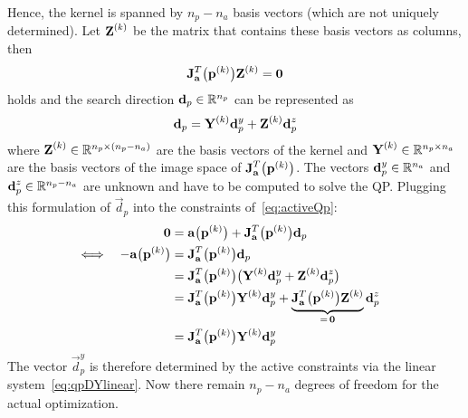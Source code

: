 				Hence, the kernel is spanned by \( n_p - n_a \) basis vectors (which are not uniquely determined). Let \( \boldsymbol{\mathrm{Z}}^{(k)} \) be the matrix that contains these basis vectors as columns, then
				\begin{align*}
					\boldsymbol{\mathrm{J}}_{\boldsymbol{\mathrm{a}}}^T\big(\boldsymbol{\mathrm{p}}^{(k)}\big) \boldsymbol{\mathrm{Z}}^{(k)} = \boldsymbol{\mathrm{0}}
				\end{align*}
				holds and the search direction \( \boldsymbol{\mathrm{d}}_p \in \mathbb{R}^{n_p} \) can be represented as
				\begin{align*}
					\boldsymbol{\mathrm{d}}_p = \boldsymbol{\mathrm{Y}}^{(k)} \boldsymbol{\mathrm{d}}_p^y + \boldsymbol{\mathrm{Z}}^{(k)} \boldsymbol{\mathrm{d}}_p^z
				\end{align*}
				where \( \boldsymbol{\mathrm{Z}}^{(k)} \in \mathbb{R}^{n_p \times (n_p - n_a)} \) are the basis vectors of the kernel and \( \boldsymbol{\mathrm{Y}}^{(k)} \in \mathbb{R}^{n_p \times n_a} \) are the basis vectors of the image space of \( \boldsymbol{\mathrm{J}}_{\boldsymbol{\mathrm{a}}}^T\big(\boldsymbol{\mathrm{p}}^{(k)}\big) \). The vectors \( \boldsymbol{\mathrm{d}}_p^y \in \mathbb{R}^{n_a} \) and \( \boldsymbol{\mathrm{d}}_p^z \in \mathbb{R}^{n_p - n_a} \) are unknown and have to be computed to solve the QP. Plugging this formulation of \( \vec{d}_p \) into the constraints of~\eqref{eq:activeQp}:
				\begin{align}
					&& \boldsymbol{\mathrm{0}} &= \boldsymbol{\mathrm{a}}\big(\boldsymbol{\mathrm{p}}^{(k)}\big) + \boldsymbol{\mathrm{J}}_{\boldsymbol{\mathrm{a}}}^T\big(\boldsymbol{\mathrm{p}}^{(k)}\big) \boldsymbol{\mathrm{d}}_p &  \nonumber \\
					\iff && -\boldsymbol{\mathrm{a}}\big(\boldsymbol{\mathrm{p}}^{(k)}\big) &= \boldsymbol{\mathrm{J}}_{\boldsymbol{\mathrm{a}}}^T\big(\boldsymbol{\mathrm{p}}^{(k)}\big) \boldsymbol{\mathrm{d}}_p &  \nonumber \\
					     &&  &= \boldsymbol{\mathrm{J}}_{\boldsymbol{\mathrm{a}}}^T\big(\boldsymbol{\mathrm{p}}^{(k)}\big) \big( \boldsymbol{\mathrm{Y}}^{(k)} \boldsymbol{\mathrm{d}}_p^y + \boldsymbol{\mathrm{Z}}^{(k)} \boldsymbol{\mathrm{d}}_p^z \big) &  \nonumber \\
					     &&  &= \boldsymbol{\mathrm{J}}_{\boldsymbol{\mathrm{a}}}^T\big(\boldsymbol{\mathrm{p}}^{(k)}\big) \boldsymbol{\mathrm{Y}}^{(k)} \boldsymbol{\mathrm{d}}_p^y + \underbrace{\boldsymbol{\mathrm{J}}_{\boldsymbol{\mathrm{a}}}^T\big(\boldsymbol{\mathrm{p}}^{(k)}\big) \boldsymbol{\mathrm{Z}}^{(k)}}_{=\, \boldsymbol{\mathrm{0}}} \boldsymbol{\mathrm{d}}_p^z &  \nonumber \\
					     &&  &= \boldsymbol{\mathrm{J}}_{\boldsymbol{\mathrm{a}}}^T\big(\boldsymbol{\mathrm{p}}^{(k)}\big) \boldsymbol{\mathrm{Y}}^{(k)} \boldsymbol{\mathrm{d}}_p^y &  \label{eq:qpDYlinear}
				\end{align}
				The vector \( \vec{d}_p^y \) is therefore determined by the active constraints via the linear system~\eqref{eq:qpDYlinear}. Now there remain \( n_p - n_a \) degrees of freedom for the actual optimization.
				
